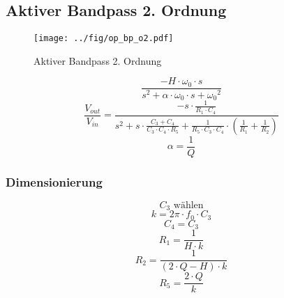 



\subsection{Aktiver Bandpass 2. Ordnung}
\label{filt:o2-bp}
\begin{figure}[h!]
	\centering
	\texttt{[image: ../fig/op\_bp\_o2.pdf]}
	\caption{Aktiver Bandpass 2. Ordnung}
	\label{sch:op-bp-o2}
\end{figure}
\[ \frac{- H \cdot \omega_0 \cdot s}
{s^2 + \alpha \cdot \omega_0 \cdot s  + {\omega_0}^2} \]
\[ \frac{V_{out}}{V_{in}} = \frac{- s \cdot \frac{1}{R_1 \cdot C_4}}
{s^2 + s \cdot \frac{C_3 + C_4}{C_3 \cdot C_4 \cdot R_5} + 
\frac{1}{R_5 \cdot C_3 \cdot C_4} \cdot 
\left(\frac{1}{R_1} + \frac{1}{R_2}\right)} \]
\[  \alpha = \frac{1}{Q}\]
\subsubsection{Dimensionierung}
\[ C_3 \text{ wählen} \]
\[ k = 2 \pi \cdot f_0 \cdot C_3 \]
\[ C_4 = C_3 \]
\[ R_1 = \frac{1}{H \cdot k} \]
\[ R_2 = \frac{1}{(2 \cdot Q - H) \cdot k} \]
\[ R_5 = \frac{2 \cdot Q}{k} \]
